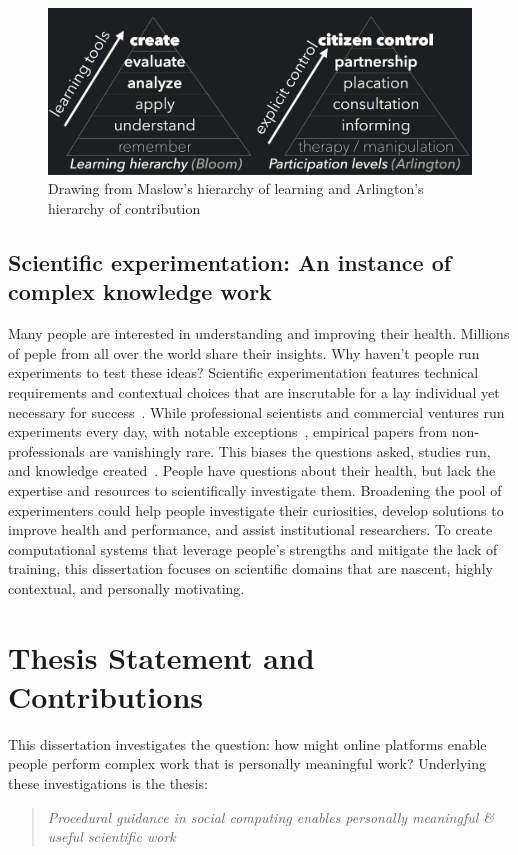 \begin{figure}[!h] 
  \centering
 \includegraphics[width=1.0\textwidth]{figures/intro/intro-taxonomy}
  \caption[Drawing from Maslow's hierarchy of learning and  hierarchy of contribution]
{Drawing from Maslow's hierarchy of learning and Arlington's hierarchy of contribution}
  \label{fig:intro-taxonomy}
\end{figure}

\subsection{Scientific experimentation: An instance of complex knowledge work}
Many people are interested in understanding and improving their health. Millions of peple from all over the world share their insights. 
Why haven't people run experiments to test these ideas? Scientific experimentation features technical requirements and contextual choices 
that are inscrutable for a lay individual yet necessary for success~\cite{Martin2007}. While 
professional scientists and commercial ventures run experiments every day, with 
notable exceptions~\cite{Cooper2010,DanaLewis}, empirical papers from non-professionals are 
vanishingly rare. This biases the questions asked, studies run, and knowledge 
created~\cite{Henrich2010a}. People have questions about their health, but lack the expertise 
and resources to scientifically investigate them. Broadening the pool of 
experimenters could help people investigate their curiosities, develop solutions 
to improve health and performance, and assist institutional researchers. To create computational systems that leverage people's strengths and mitigate the lack of training, this dissertation 
focuses on scientific domains that are nascent, highly contextual, and personally motivating.

\section{Thesis Statement and Contributions}
This dissertation investigates the question: how might online platforms enable people perform 
complex work that is personally meaningful work? Underlying these investigations is the thesis:
\begin{quote}
\emph{Procedural guidance in social computing enables personally meaningful \& useful scientific work}
\end{quote}

